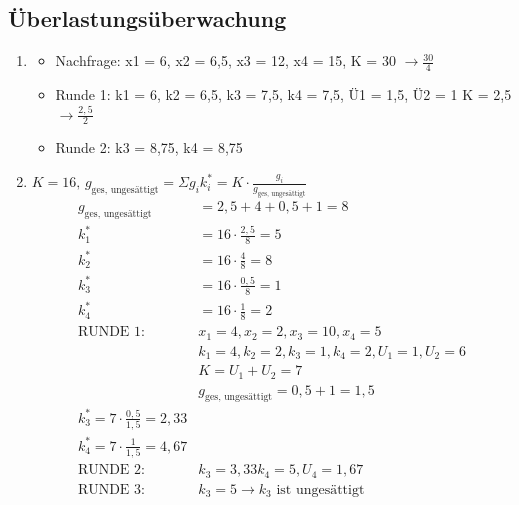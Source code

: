 \subsection{Überlastungsüberwachung}
\begin{enumerate}
	\item 
	\begin{itemize}
		\item Nachfrage: x1 = 6, x2 = 6,5, x3 = 12, x4 = 15, K = 30 $\to \frac{30}{4}$
		\item Runde 1: k1 = 6, k2 = 6,5, k3 = 7,5, k4 = 7,5, Ü1 = 1,5, Ü2 = 1 K = 2,5$\to \frac{2,5}{2}$
		\item Runde 2: k3 = 8,75, k4 = 8,75
	\end{itemize}
	\item $K = 16\text{, }g_{\text{ges, ungesättigt}} = \Sigma g_i k_i^* = K \cdot \frac{g_i}{g_{\text{ges, ungesättigt}}}$
	\begin{align*}
		g_{\text{ges, ungesättigt}} &= 2,5 + 4 + 0,5 + 1 = 8\\
		k_1^* &= 16 \cdot \frac{2,5}{8} = 5\\
		k_2^* &= 16 \cdot \frac{4}{8}= 8\\
		k_3^* &= 16 \cdot \frac{0,5}{8} = 1\\
		k_4^* &= 16 \cdot \frac{1}{8}= 2 \\
		\text{RUNDE 1:} &x_1 = 4, x_2 = 2, x_3 = 10, x_4 = 5 \\
		&k_1 = 4, k_2 = 2, k_3 = 1, k_4 = 2, U_1 = 1, U_2 = 6\\
		&K = U_1 + U_2 = 7\\
		&g_{\text{ges, ungesättigt}} = 0,5 + 1 = 1,5\\
		k_3^* = 7 \cdot \frac{0,5}{1,5} = 2,33\\
		k_4^* = 7 \cdot \frac{1}{1,5} = 4,67\\
		\text{RUNDE 2:} &k_3 = 3,33 k_4 = 5, U_4 = 1,67\\
		\text{RUNDE 3:} &k_3 = 5 \to k_3 \text{ ist ungesättigt}
	\end{align*}
\end{enumerate}
